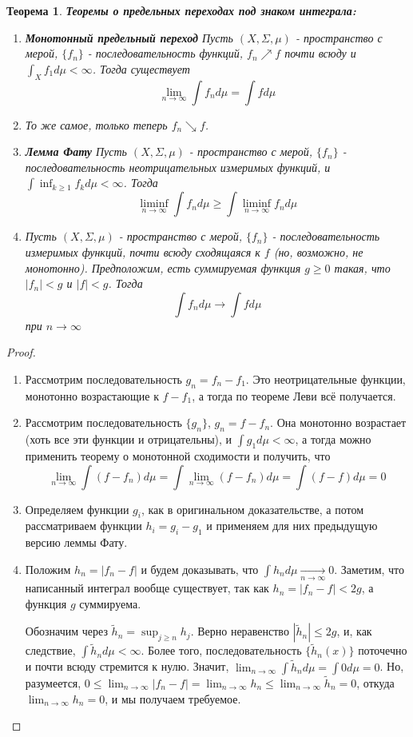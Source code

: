 \documentclass[a4paper]{article}
\theoremstyle{indented}
\newtheorem{theorem}{Теорема}
\theoremstyle{definition}
\theoremstyle{remark}
\DeclareMathOperator{\ra}{\rightarrow}
\begin{document}
\begin{theorem}
\textbf{Теоремы о предельных переходах под знаком интеграла:}
\begin{enumerate}
    \item \textbf{Монотонный предельный переход} Пусть $(X, \Sigma, \mu)$ - пространство с мерой, $\{f_n\}$ - последовательность функций, $f_n \nearrow f$ почти всюду и  $\int_X f_1 d \mu < \infty$. Тогда существует $$\lim_{n \ra \infty} \int f_n d \mu = \int f d \mu$$
    \item То же самое, только теперь $f_n \searrow f$.
    \item \textbf{Лемма Фату} Пусть $(X, \Sigma, \mu)$ - пространство с мерой, $\{f_n\}$ - последовательность неотрицательных измеримых функций, и $\int \inf_{k \geq 1} f_k d \mu < \infty$. Тогда $$\liminf_{n \ra \infty} \int f_n d \mu \geq \int \liminf_{n \ra \infty} f_n d \mu$$
    \item {} Пусть $(X, \Sigma, \mu)$ - пространство с мерой, $\{f_n\}$ - последовательность измеримых функций, почти всюду сходящаяся к $f$ (но, возможно, не монотонно). Предположим, есть суммируемая функция $g \geq 0$ такая, что $|f_n|<g$ и $|f|<g$. Тогда $$\int f_n d \mu \ra \int f d \mu$$ при $n \ra \infty$
\end{enumerate}
\end{theorem}
\begin{proof}
\
\begin{enumerate}
    \item Рассмотрим последовательность $g_n=f_n-f_1$. Это неотрицательные функции, монотонно возрастающие к $f-f_1$, а тогда по теореме Леви всё получается.
    \item Рассмотрим последовательность $\{g_n\}$, $g_n=f-f_n$. Она монотонно возрастает (хоть все эти функции и отрицательны), и $\int g_1 d 
\mu < \infty$, а тогда можно применить теорему о монотонной сходимости и получить, что $$\lim_{n \ra \infty} \int (f-f_n) d \mu = \int \lim_{n \ra \infty} (f-f_n) d \mu = \int (f-f) d \mu = 0$$
    \item Определяем функции $g_i$, как в оригинальном доказательстве, а потом рассматриваем функции $h_i = g_i-g_1$ и применяем для них предыдущую версию леммы Фату.
    \item Положим $h_n = |f_n-f|$ и будем доказывать, что $\int   h_n d \mu \underset{n \ra \infty}{\longrightarrow} 0$. Заметим, что написанный интеграл вообще существует, так как $h_n=|f_n-f|<2g$, а функция $g$ суммируема.
    
    Обозначим через $\tilde{h}_n = \sup_{j \geq n} h_j$. Верно неравенство $|\tilde{h}_n| \leq 2g$, и, как следствие, $\int \tilde{h}_n d \mu  < \infty$. Более того, последовательность $\{\tilde{h}_n(x)\}$ поточечно и почти всюду стремится к нулю. Значит, $\lim_{n \ra \infty} \int \tilde{h}_n d \mu = \int 0 d \mu = 0$. Но, разумеется, $0 \leq \lim_{n \ra \infty} |f_n-f| = \lim_{n \ra \infty} h_n \leq \lim_{n \ra \infty} \tilde{h}_n = 0$, откуда $\lim_{n \ra \infty} h_n = 0$, и мы получаем требуемое.
\end{enumerate}
\end{proof}
\end{document}
